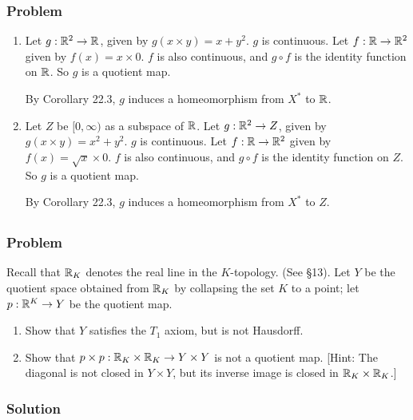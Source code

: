 \subsubsection{Problem}
\begin{enumerate}
\item Let $g : \mathbb R^2 \to \mathbb R$, given by $g(x \times y) = x + y^2$. $g$ is continuous. Let $f : \mathbb R \to \mathbb R^2$ given by $f(x) = x \times 0$. $f$ is also continuous, and $g \circ f$ is the identity function on $\mathbb R$. So $g$ is a quotient map.

By Corollary 22.3, $g$ induces a homeomorphism from $X^*$ to $\mathbb R$.

\item Let $Z$ be $[0,\infty)$ as a subspace of $\mathbb R$. Let $g : \mathbb R^2 \to Z$, given by $g(x \times y) = x^2 + y^2$. $g$ is continuous. Let $f : \mathbb R \to \mathbb R^2$ given by $f(x) = \sqrt{x} \times 0$. $f$ is also continuous, and $g \circ f$ is the identity function on $Z$. So $g$ is a quotient map.

By Corollary 22.3, $g$ induces a homeomorphism from $X^*$ to $Z$.
\end{enumerate}


\setcounter{subsection}{5} %
\subsection{}

\subsubsection{Problem}
Recall that $\mathbb R_K$ denotes the real line in the $K$-topology. (See \S 13). Let $Y$ be the quotient space obtained from $\mathbb R_K$ by collapsing the set $K$ to a point; let $p : \mathbb R^K \to Y$ be the quotient map.
\begin{enumerate}
\item Show that $Y$ satisfies the $T_1$ axiom, but is not Hausdorff.
\item Show that $p \times p : \mathbb R_K \times \mathbb R_K \to Y \times Y$ is not a quotient map. [Hint: The diagonal is not closed in $Y \times Y$, but its inverse image is closed in $\mathbb R_K \times \mathbb R_K$.]
\end{enumerate}
\subsubsection{Solution}

